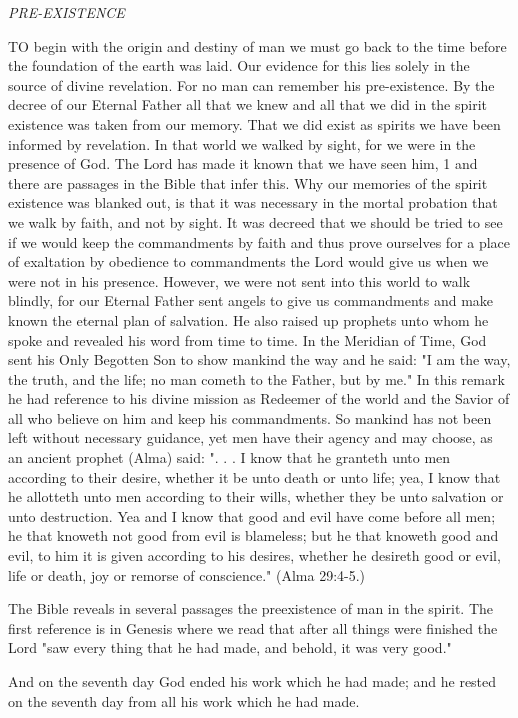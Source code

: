 \textit{PRE-EXISTENCE}

TO begin with the origin and destiny of man we must go back to the time before the
foundation of the earth was laid. Our evidence for this lies solely in the source of divine
revelation. For no man can remember his pre-existence. By the decree of our Eternal Father
all that we knew and all that we did in the spirit existence was taken from our memory. That
we did exist as spirits we have been informed by revelation. In that world we walked by
sight, for we were in the presence of God. The Lord has made it known that we have seen
him, 1 and there are passages in the Bible that infer this. Why our memories of the spirit
existence was blanked out, is that it was necessary in the mortal probation that we walk by
faith, and not by sight. It was decreed that we should be tried to see if we would keep the
commandments by faith and thus prove ourselves for a place of exaltation by obedience to
commandments the Lord would give us when we were not in his presence. However, we
were not sent into this world to walk blindly, for our Eternal Father sent angels to give us
commandments and make known the eternal plan of salvation. He also raised up prophets
unto whom he spoke and revealed his word from time to time. In the Meridian of Time, God
sent his Only Begotten Son to show mankind the way and he said: "I am the way, the truth,
and the life; no man cometh to the Father, but by me." In this remark he had reference to his
divine mission as Redeemer of the world and the Savior of all who believe on him and keep
his commandments. So mankind has not been left without necessary guidance, yet men have
their agency and may choose, as an ancient prophet (Alma) said: ". . . I know that he granteth
unto men according to their desire, whether it be unto death or unto life; yea, I know that he
allotteth unto men according to their wills, whether they be unto salvation or unto
destruction. Yea and I know that good and evil have come before all men; he that knoweth
not good from evil is blameless; but he that knoweth good and evil, to him it is given
according to his desires, whether he desireth good or evil, life or death, joy or remorse of
conscience." (Alma 29:4-5.)

The Bible reveals in several passages the preexistence of man in the spirit. The first reference
is in Genesis where we read that after all things were finished the Lord "saw every thing that
he had made, and behold, it was very good."

And on the seventh day God ended his work which he had made; and he rested on the
seventh day from all his work which he had made.

